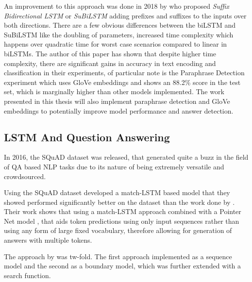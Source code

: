 \documentclass[a4paper,12pt]{report}
\begin{document}
			  An improvement to this approach was done in 2018 by \citep{lstmSubilstm} who proposed \textit{Suffix Bidirectional LSTM} or \textit{SuBiLSTM} adding prefixes and suffixes to the inputs over both directions.  There are a few obvious differences between the biLSTM and SuBiLSTM like the doubling of parameters, increased time complexity which happens over quadratic time for worst case scenarios compared to linear in biLSTMs.
			  The author of this paper has shown that despite higher time complexity, there are significant gains in accuracy in text encoding and classification in their experiments, of particular note is the Paraphrase Detection experiment which uses GloVe embeddings and shows an 88.2\% score in the test set, which is marginally higher than other models implemented.
			  The work presented in this thesis will also implement paraphrase detection and GloVe embeddings to potentially improve model performance and answer detection.

			  \subsection{LSTM And Question Answering}\label{c2lstmqa}
             In 2016, the SQuAD dataset \citep{dataset1} was released, that generated quite a buzz in the field of QA based NLP tasks due to its nature of being extremely versatile and crowdsourced. 

             Using the SQuAD dataset \citep{lstmhu2016question} developed a match-LSTM \citep{lstmMatch} based model that they showed performed significantly better on the dataset than the work done by \citep{dataset1}. Their work shows that using a match-LSTM approach combined with a Pointer Net model \citep{lstmPointer}, that aids token predictions using only input sequences rather than using any form of large fixed vocabulary, therefore allowing for generation of answers with multiple tokens.

             The approach by \citep{lstmhu2016question} was tw-fold. The first approach implemented as a sequence model and the second as a boundary model, which was further extended with a search function.
\end{document}
